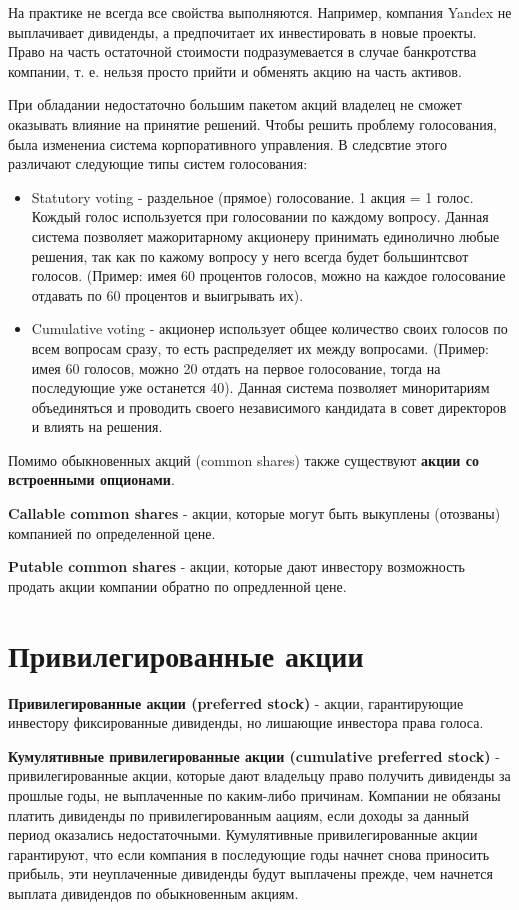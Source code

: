 \documentclass{article}
\begin{document}
     На практике не всегда все свойства выполняются. Например, компания Yandex не выплачивает дивиденды, а предпочитает их инвестировать в новые проекты. Право на часть остаточной стоимости подразумевается в случае банкротства компании, т. е. нельзя просто прийти и обменять акцию на часть активов. 
     
     При обладании недостаточно большим пакетом акций владелец не сможет оказывать влияние на принятие решений. Чтобы решить проблему голосования, была изменениа система корпоративного управления. В следсвтие этого различают следующие типы систем голосования: 
     \begin{itemize}
     \item Statutory voting - раздельное (прямое) голосование. 1 акция = 1 голос. Кождый голос используется при голосовании по каждому вопросу. Данная система позволяет мажоритарному акционеру принимать единолично любые решения, так как по кажому вопросу у него всегда будет большинтсвот голосов. (Пример: имея 60 процентов голосов, можно на каждое голосование отдавать по 60 процентов и выигрывать их). 

     \item Cumulative voting - акционер использует общее количество своих голосов по всем вопросам сразу, то есть распределяет их между вопросами. (Пример: имея 60 голосов, можно 20 отдать на первое голосование, тогда на последующие уже останется 40). Данная система позволяет миноритариям объединяться и проводить своего независимого кандидата в совет директоров и влиять на решения.
\end{itemize}

Помимо обыкновенных акций (common shares) также существуют \textbf{акции со встроенными опционами}.

\textbf{Callable common shares} - акции, которые могут быть выкуплены (отозваны) компанией по определенной цене.

\textbf{Putable common shares} - акции, которые дают  инвестору возможность продать акции компании обратно по опредленной цене.

\section{Привилегированные акции}

    \textbf{Привилегированные акции (preferred stock)} - акции, гарантирующие инвестору фиксированные дивиденды, но лишающие инвестора права голоса.

\textbf{Кумулятивные привилегированные акции (cumulative preferred stock)} - привилегированные акции, которые дают владельцу право получить дивиденды за прошлые годы, не выплаченные по каким-либо причинам. Компании не обязаны платить дивиденды по привилегированным аациям, если доходы за данный период оказались недостаточными. Кумулятивные привилегированные акции гарантируют, что если компания в последующие годы начнет снова приносить прибыль, эти неуплаченные дивиденды будут выплачены прежде, чем начнется выплата дивидендов по обыкновенным акциям.
\end{document}
